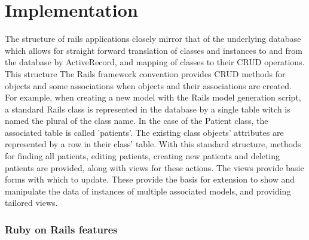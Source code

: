 \documentclass[letterpaper]{amsart}
\begin{document}
\part{Implementation}
The structure of rails applications closely mirror that of the underlying database which allows for straight forward translation of classes and instances to and from the database by ActiveRecord, and mapping of classes to their CRUD operations.   This structure
The Rails framework convention provides CRUD methods for objects and some associations when objects and their associations are created.  For example, when creating a new model with the Rails model generation script, a standard Rails class is represented in the database by a single table witch is named the plural of the class name.  In the case of the Patient class, the associated table is called 'patients'.  The existing class objects' attributes are represented by a row in their class' table.  With this standard structure, methods for finding all patients, editing patients, creating new patients and deleting patients are provided, along with views for these actions.  The views provide basic forms with which to update.  These provide the basis for extension to show and manipulate the data of instances of multiple associated models, and providing tailored views. 
\section{Ruby on Rails features}
\end{document}
